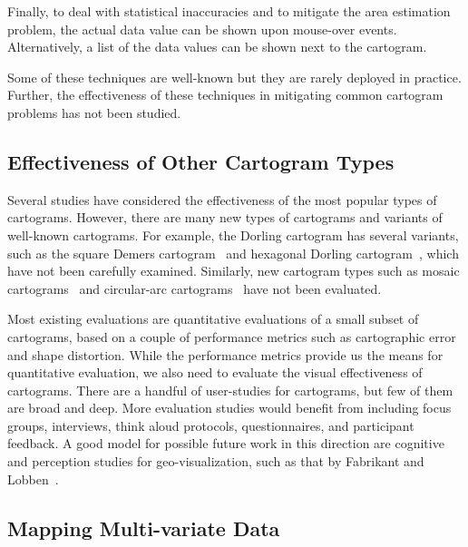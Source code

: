 \documentclass{egpubl}
\begin{document}
 Finally, to deal with statistical inaccuracies and to mitigate the area estimation problem, the actual data value can be shown upon mouse-over events. Alternatively, a list of the data values can be shown next to the cartogram. 
 
Some of these techniques are well-known but they are rarely deployed in practice. Further, the effectiveness of these techniques in mitigating common cartogram problems has not been studied.
 








\subsection{Effectiveness of Other Cartogram Types}
Several studies have considered the effectiveness of the most popular types of cartograms. However, there are many new types of cartograms and variants of well-known cartograms. For example, the Dorling cartogram has several  variants, such as the square Demers cartogram~\cite{Bivar_book} and hexagonal Dorling cartogram~\cite{hennig2012rediscovering}, which have not been carefully examined. Similarly, new cartogram types such as mosaic cartograms~\cite{cano2015mosaic} and circular-arc cartograms~\cite{KKN13} have not been evaluated.

Most existing evaluations are quantitative evaluations of a small subset of cartograms, based on a couple of performance metrics such as cartographic error and shape distortion. While the performance metrics provide us the means for quantitative evaluation, we also need to evaluate the visual effectiveness of cartograms.
There are a handful of user-studies for cartograms, but few of them are broad and deep. More evaluation studies would benefit from including focus groups, interviews, think aloud protocols, questionnaires, and participant feedback. A good model for possible future work in this direction are cognitive and perception studies for geo-visualization, such as that by Fabrikant and Lobben~\cite{fabrikant2009introduction}. 



\subsection{Mapping Multi-variate Data}
\label{multivar}
\end{document}
